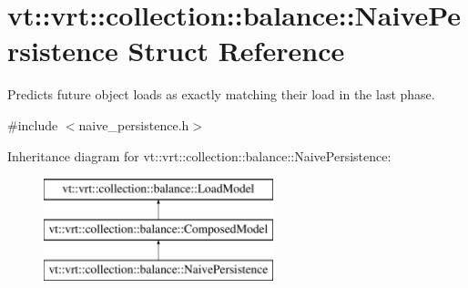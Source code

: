 \hypertarget{structvt_1_1vrt_1_1collection_1_1balance_1_1_naive_persistence}{}\section{vt\+:\+:vrt\+:\+:collection\+:\+:balance\+:\+:Naive\+Persistence Struct Reference}
\label{structvt_1_1vrt_1_1collection_1_1balance_1_1_naive_persistence}


Predicts future object loads as exactly matching their load in the last phase.  




{\ttfamily \#include $<$naive\+\_\+persistence.\+h$>$}

Inheritance diagram for vt\+:\+:vrt\+:\+:collection\+:\+:balance\+:\+:Naive\+Persistence\+:\begin{figure}[H]
\begin{center}
\leavevmode
\includegraphics[height=3.000000cm]{structvt_1_1vrt_1_1collection_1_1balance_1_1_naive_persistence}
\end{center}
\end{figure}
